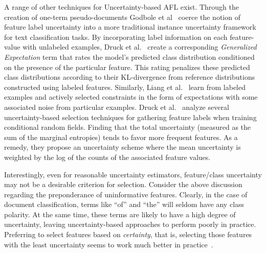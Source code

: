 A range of other techniques for Uncertainty-based AFL exist. Through the creation of one-term pseudo-documents Godbole et al~\cite{godbole04} coerce the notion of feature label uncertainty into a more traditional instance uncertainty framework for text classification tasks. By incorporating label information on each feature-value with unlabeled examples, Druck et al.~\cite{druck:sigir08} create a corresponding \textit{Generalized Expectation} term that rates the model's predicted class distribution
conditioned on the presence of the particular feature. This rating penalizes these predicted class distributions according to their KL-divergence from reference distributions constructed using labeled features. Similarly, Liang et al.~\cite{liang:icml09} learn from labeled examples and actively selected constraints in the form of expectations with some associated noise from particular examples.  Druck et al.~\cite{druk:EMNLP:2009} analyze several uncertainty-based selection techniques for gathering feature labels when training conditional random fields. Finding that the total uncertainty (measured as the sum of the marginal entropies) tends to favor more frequent features. As a remedy, they propose an uncertainty scheme where the mean uncertainty is weighted by the log of the counts of the associated feature values.

Interestingly, even for reasonable uncertainty estimators, feature/class uncertainty may not be a desirable criterion for selection. Consider the above discussion regarding the preponderance of uninformative features. Clearly, in the case of document classification, terms like ``of'' and ``the'' will seldom have any class polarity. At the same time, these terms are likely to have a high degree of uncertainty, leaving uncertainty-based approaches to perform poorly in practice. Preferring to select features based on \emph{certainty}, that is, selecting those features with the least uncertainty seems to work much better in practice~\cite{sindhwani:icml09, melville:naacl09}.




